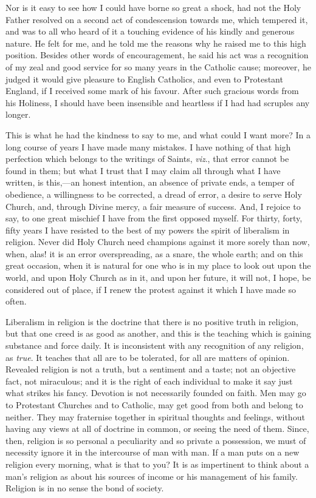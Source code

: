 Nor is it easy to see how I could have borne so great a shock, had
not the Holy Father resolved on a second act of condescension
towards me, which tempered it, and was to all who heard of it a
touching evidence of his kindly and generous nature. He felt for me,
and he told me the reasons why he raised me to this high position.
Besides other words of encouragement, he said his act was a
recognition of my zeal and good service for so many years in the
Catholic cause; moreover, he judged it would give pleasure to English
Catholics, and even to Protestant England, if I received some mark of
his favour. After such gracious words from his Holiness, I should have
been insensible and heartless if I had had scruples any longer.

This is what he had the kindness to say to me, and what could I
want more? In a long course of years I have made many mistakes. I have
nothing of that high perfection which belongs to the writings of
Saints, \emph{viz}., that error cannot be found in them; but what I
trust that I may claim all through what I have written, is this,—an
honest intention, an absence of private ends, a temper of obedience, a
willingness to be corrected, a dread of error, a desire to serve Holy
Church, and, through Divine mercy, a fair measure of success.
And, I rejoice to say, to one great mischief I have from the first
opposed myself. For thirty, forty, fifty years I have resisted to the
best of my powers the spirit of liberalism in religion. Never did Holy
Church need champions against it more sorely than now, when, alas! it
is an error overspreading, as a snare, the whole earth; and on this
great occasion, when it is natural for one who is in my place to look
out upon the world, and upon Holy Church as in it, and upon her
future, it will not, I hope, be considered out of place, if I renew
the protest against it which I have made so often.

Liberalism in religion is the doctrine that there is no positive
truth in religion, but that one creed is as good as another, and this
is the teaching which is gaining substance and force daily. It is
inconsistent with any recognition of any religion, as \emph{true}. It
teaches that all are to be tolerated, for all are matters of opinion.
Revealed religion is not a truth, but a sentiment and a taste; not an
objective fact, not miraculous; and it is the right of each individual
to make it say just what strikes his fancy. Devotion is not
necessarily founded on faith. Men may go to Protestant Churches and to
Catholic, may get good from both and belong to neither. They may
fraternise together in spiritual thoughts and feelings, without having
any views at all of doctrine in common, or seeing the need of them.
Since, then, religion is so personal a peculiarity and so private a
possession, we must of necessity ignore it in the intercourse of man
with man. If a man puts on a new religion every morning, what is that
to you? It is as impertinent to think about a man's religion as about
his sources of income or his management of his family. Religion is in
no sense the bond of society.

